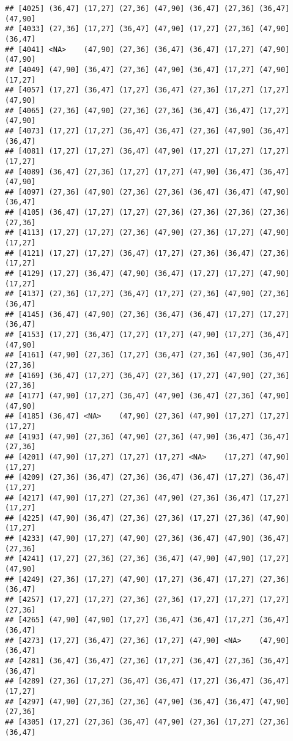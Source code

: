 \documentclass[12pt,]{article}
\begin{document}
\begin{verbatim}
## [4025] (36,47] (17,27] (27,36] (47,90] (36,47] (27,36] (36,47] (47,90]
## [4033] (27,36] (17,27] (36,47] (47,90] (17,27] (27,36] (47,90] (36,47]
## [4041] <NA>    (47,90] (27,36] (36,47] (36,47] (17,27] (47,90] (47,90]
## [4049] (47,90] (36,47] (27,36] (47,90] (36,47] (17,27] (47,90] (17,27]
## [4057] (17,27] (36,47] (17,27] (36,47] (27,36] (17,27] (17,27] (47,90]
## [4065] (27,36] (47,90] (27,36] (27,36] (36,47] (36,47] (17,27] (47,90]
## [4073] (17,27] (17,27] (36,47] (36,47] (27,36] (47,90] (36,47] (36,47]
## [4081] (17,27] (17,27] (36,47] (47,90] (17,27] (17,27] (17,27] (17,27]
## [4089] (36,47] (27,36] (17,27] (17,27] (47,90] (36,47] (36,47] (47,90]
## [4097] (27,36] (47,90] (27,36] (27,36] (36,47] (36,47] (47,90] (36,47]
## [4105] (36,47] (17,27] (17,27] (27,36] (27,36] (27,36] (27,36] (27,36]
## [4113] (17,27] (17,27] (27,36] (47,90] (27,36] (17,27] (47,90] (17,27]
## [4121] (17,27] (17,27] (36,47] (17,27] (27,36] (36,47] (27,36] (17,27]
## [4129] (17,27] (36,47] (47,90] (36,47] (17,27] (17,27] (47,90] (17,27]
## [4137] (27,36] (17,27] (36,47] (17,27] (27,36] (47,90] (27,36] (36,47]
## [4145] (36,47] (47,90] (27,36] (36,47] (36,47] (17,27] (17,27] (36,47]
## [4153] (17,27] (36,47] (17,27] (17,27] (47,90] (17,27] (36,47] (47,90]
## [4161] (47,90] (27,36] (17,27] (36,47] (27,36] (47,90] (36,47] (27,36]
## [4169] (36,47] (17,27] (36,47] (27,36] (17,27] (47,90] (27,36] (27,36]
## [4177] (47,90] (17,27] (36,47] (47,90] (36,47] (27,36] (47,90] (47,90]
## [4185] (36,47] <NA>    (47,90] (27,36] (47,90] (17,27] (17,27] (17,27]
## [4193] (47,90] (27,36] (47,90] (27,36] (47,90] (36,47] (36,47] (27,36]
## [4201] (47,90] (17,27] (17,27] (17,27] <NA>    (17,27] (47,90] (17,27]
## [4209] (27,36] (36,47] (27,36] (36,47] (36,47] (17,27] (36,47] (17,27]
## [4217] (47,90] (17,27] (27,36] (47,90] (27,36] (36,47] (17,27] (17,27]
## [4225] (47,90] (36,47] (27,36] (27,36] (17,27] (27,36] (47,90] (17,27]
## [4233] (47,90] (17,27] (47,90] (27,36] (36,47] (47,90] (36,47] (27,36]
## [4241] (17,27] (27,36] (27,36] (36,47] (47,90] (47,90] (17,27] (47,90]
## [4249] (27,36] (17,27] (47,90] (17,27] (36,47] (17,27] (27,36] (36,47]
## [4257] (17,27] (17,27] (27,36] (27,36] (17,27] (17,27] (17,27] (27,36]
## [4265] (47,90] (47,90] (17,27] (36,47] (36,47] (17,27] (36,47] (36,47]
## [4273] (17,27] (36,47] (27,36] (17,27] (47,90] <NA>    (47,90] (36,47]
## [4281] (36,47] (36,47] (27,36] (17,27] (36,47] (27,36] (36,47] (36,47]
## [4289] (27,36] (17,27] (36,47] (36,47] (17,27] (36,47] (36,47] (17,27]
## [4297] (47,90] (27,36] (27,36] (47,90] (36,47] (36,47] (47,90] (27,36]
## [4305] (17,27] (27,36] (36,47] (47,90] (27,36] (17,27] (27,36] (36,47]

\end{verbatim}
\end{document}
